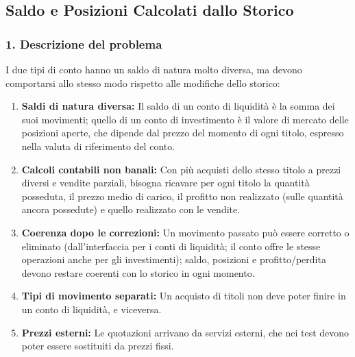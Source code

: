 \documentclass[11pt,a4paper,openright]{report}
\begin{document}
\subsection{Saldo e Posizioni Calcolati dallo Storico}

\subsubsection*{1. Descrizione del problema}
I due tipi di conto hanno un saldo di natura molto diversa, ma devono comportarsi allo stesso modo rispetto alle modifiche dello storico:
\begin{enumerate}
    \item \textbf{Saldi di natura diversa:} Il saldo di un conto di liquidità è la somma dei suoi movimenti; quello di un conto di investimento è il valore di mercato delle posizioni aperte, che dipende dal prezzo del momento di ogni titolo, espresso nella valuta di riferimento del conto.
    \item \textbf{Calcoli contabili non banali:} Con più acquisti dello stesso titolo a prezzi diversi e vendite parziali, bisogna ricavare per ogni titolo la quantità posseduta, il prezzo medio di carico, il profitto non realizzato (sulle quantità ancora possedute) e quello realizzato con le vendite.
    \item \textbf{Coerenza dopo le correzioni:} Un movimento passato può essere corretto o eliminato (dall'interfaccia per i conti di liquidità; il conto offre le stesse operazioni anche per gli investimenti); saldo, posizioni e profitto/perdita devono restare coerenti con lo storico in ogni momento.
    \item \textbf{Tipi di movimento separati:} Un acquisto di titoli non deve poter finire in un conto di liquidità, e viceversa.
    \item \textbf{Prezzi esterni:} Le quotazioni arrivano da servizi esterni, che nei test devono poter essere sostituiti da prezzi fissi.
\end{enumerate}
\end{document}
